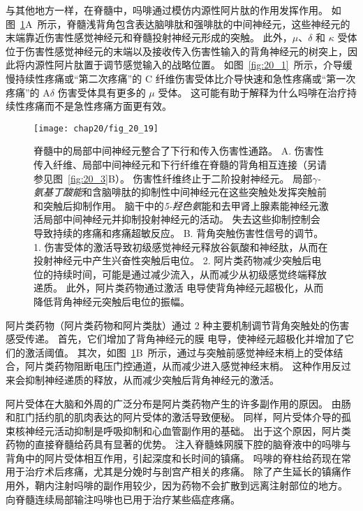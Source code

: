 与其他地方一样，在脊髓中，吗啡通过模仿内源性阿片肽的作用发挥作用。
如图~\ref{fig:20_19}A~所示，脊髓浅背角包含表达脑啡肽和强啡肽的中间神经元，这些神经元的末端靠近伤害性感觉神经元和脊髓投射神经元形成的突触。
此外，$\mu$、$\delta$ 和 $ \kappa $ 受体位于伤害性感觉神经元的末端以及接收传入伤害性输入的背角神经元的树突上，因此将内源性阿片肽置于调节感觉输入的战略位置。
如图~\ref{fig:20_1}~所示，介导缓慢持续性疼痛或“第二次疼痛”的 C 纤维伤害受体比介导快速和急性疼痛或“第一次疼痛”的 A$\delta$ 伤害受体具有更多的 $\mu$ 受体。
这可能有助于解释为什么吗啡在治疗持续性疼痛而不是急性疼痛方面更有效。


\begin{figure}[htbp]
	\centering
	\texttt{[image: chap20/fig\_20\_19]}
	\caption{脊髓中的局部中间神经元整合了下行和传入伤害性通路。
		A. 伤害性传入纤维、局部中间神经元和下行纤维在脊髓的背角相互连接（另请参见图~\ref{fig:20_3}B）。
		伤害性纤维终止于二阶投射神经元。
		局部\textit{$\gamma$-氨基丁酸能}和含脑啡肽的抑制性中间神经元在这些突触处发挥突触前和突触后抑制作用。
		脑干中的\textit{5-羟色氨}能和去甲肾上腺素能神经元激活局部中间神经元并抑制投射神经元的活动。
		失去这些抑制控制会导致持续的疼痛和疼痛超敏反应。
		B. 背角突触伤害性信号的调节。
		1. 伤害受体的激活导致初级感觉神经元释放谷氨酸和神经肽，从而在投射神经元中产生兴奋性突触后电位。
		2. 阿片类药物减少突触后电位的持续时间，可能是通过减少流入，从而减少从初级感觉终端释放递质。
		此外，阿片类药物通过激活  电导使背角神经元超极化，从而降低背角神经元突触后电位的振幅。}
	\label{fig:20_19}
\end{figure}


阿片类药物（阿片类药物和阿片类肽）通过 2 种主要机制调节背角突触处的伤害感受传递。
首先，它们增加了背角神经元的膜  电导，使神经元超极化并增加了它们的激活阈值。
其次，如图~\ref{fig:20_19}B~所示，通过与突触前感觉神经末梢上的受体结合，阿片类药物阻断电压门控通道，从而减少进入感觉神经末梢。
这种作用反过来会抑制神经递质的释放，从而减少突触后背角神经元的激活。


阿片受体在大脑和外周的广泛分布是阿片类药物产生的许多副作用的原因。
由肠和肛门括约肌的肌肉表达的阿片受体的激活导致便秘。
同样，阿片受体介导的孤束核神经元活动抑制是呼吸抑制和心血管副作用的基础。
出于这个原因，阿片类药物的直接脊髓给药具有显著的优势。
注入脊髓蛛网膜下腔的脑脊液中的吗啡与背角中的阿片受体相互作用，引起深度和长时间的镇痛。
吗啡的脊柱给药现在常用于治疗术后疼痛，尤其是分娩时与剖宫产相关的疼痛。
除了产生延长的镇痛作用外，鞘内注射吗啡的副作用较少，因为药物不会扩散到远离注射部位的地方。
向脊髓连续局部输注吗啡也已用于治疗某些癌症疼痛。


